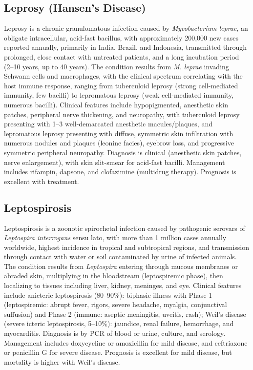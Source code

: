 \subsection{Leprosy (Hansen's Disease)}
\label{sec:Leprosy}
Leprosy is a chronic granulomatous infection caused by \textit{Mycobacterium leprae}, an obligate intracellular, acid-fast bacillus, with approximately 200,000 new cases reported annually, primarily in India, Brazil, and Indonesia, transmitted through prolonged, close contact with untreated patients, and a long incubation period (2--10 years, up to 40 years). The condition results from \textit{M. leprae} invading Schwann cells and macrophages, with the clinical spectrum correlating with the host immune response, ranging from tuberculoid leprosy (strong cell-mediated immunity, few bacilli) to lepromatous leprosy (weak cell-mediated immunity, numerous bacilli). Clinical features include hypopigmented, anesthetic skin patches, peripheral nerve thickening, and neuropathy, with tuberculoid leprosy presenting with 1--3 well-demarcated anesthetic macules/plaques, and lepromatous leprosy presenting with diffuse, symmetric skin infiltration with numerous nodules and plaques (leonine facies), eyebrow loss, and progressive symmetric peripheral neuropathy. Diagnosis is clinical (anesthetic skin patches, nerve enlargement), with skin slit-smear for acid-fast bacilli. Management includes rifampin, dapsone, and clofazimine (multidrug therapy). Prognosis is excellent with treatment.

\subsection{Leptospirosis}
\label{sec:Leptospirosis}
Leptospirosis is a zoonotic spirochetal infection caused by pathogenic serovars of \textit{Leptospira interrogans} sensu lato, with more than 1 million cases annually worldwide, highest incidence in tropical and subtropical regions, and transmission through contact with water or soil contaminated by urine of infected animals. The condition results from \textit{Leptospira} entering through mucous membranes or abraded skin, multiplying in the bloodstream (leptospiremic phase), then localizing to tissues including liver, kidney, meninges, and eye. Clinical features include anicteric leptospirosis (80--90\%): biphasic illness with Phase 1 (leptospiremic: abrupt fever, rigors, severe headache, myalgia, conjunctival suffusion) and Phase 2 (immune: aseptic meningitis, uveitis, rash); Weil's disease (severe icteric leptospirosis, 5--10\%): jaundice, renal failure, hemorrhage, and myocarditis. Diagnosis is by PCR of blood or urine, culture, and serology. Management includes doxycycline or amoxicillin for mild disease, and ceftriaxone or penicillin G for severe disease. Prognosis is excellent for mild disease, but mortality is higher with Weil's disease.

